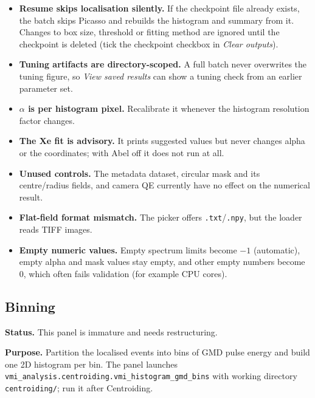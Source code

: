 \documentclass[11pt,a4paper]{article}
\newcommand{\code}[1]{\texttt{#1}}
\begin{document}
\begin{itemize}
  \item \textbf{Resume skips localisation silently.} If the checkpoint file
        already exists, the batch skips Picasso and rebuilds the histogram
        and summary from it. Changes to box size, threshold or fitting
        method are ignored until the checkpoint is deleted (tick the
        checkpoint checkbox in \emph{Clear outputs}).
  \item \textbf{Tuning artifacts are directory-scoped.} A full batch never
        overwrites the tuning figure, so \emph{View saved results} can show a
        tuning check from an earlier parameter set.
  \item \textbf{$\alpha$ is per histogram pixel.} Recalibrate it whenever the
        histogram resolution factor changes.
  \item \textbf{The Xe fit is advisory.} It prints suggested values but never
        changes alpha or the coordinates; with Abel off it does not run at
        all.
  \item \textbf{Unused controls.} The metadata dataset, circular mask and its
        centre/radius fields, and camera QE currently have no effect on the
        numerical result.
  \item \textbf{Flat-field format mismatch.} The picker offers
        \code{.\allowbreak{}txt}/\code{.\allowbreak{}npy}, but the loader reads TIFF images.
  \item \textbf{Empty numeric values.} Empty spectrum limits become $-1$
        (automatic), empty alpha and mask values stay empty, and other empty
        numbers become 0, which often fails validation (for example CPU
        cores).
\end{itemize}

\subsection{Binning}
\label{sec:binning}

\textbf{Status.} This panel is immature and needs restructuring.

\textbf{Purpose.} Partition the localised events into bins of GMD pulse
energy and build one 2D histogram per bin. The panel launches
\code{vmi\_\allowbreak{}analysis.centroiding.vmi\_\allowbreak{}histogram\_\allowbreak{}gmd\_\allowbreak{}bins} with working
directory \code{centroiding/\allowbreak{}}; run it after Centroiding.
\end{document}

